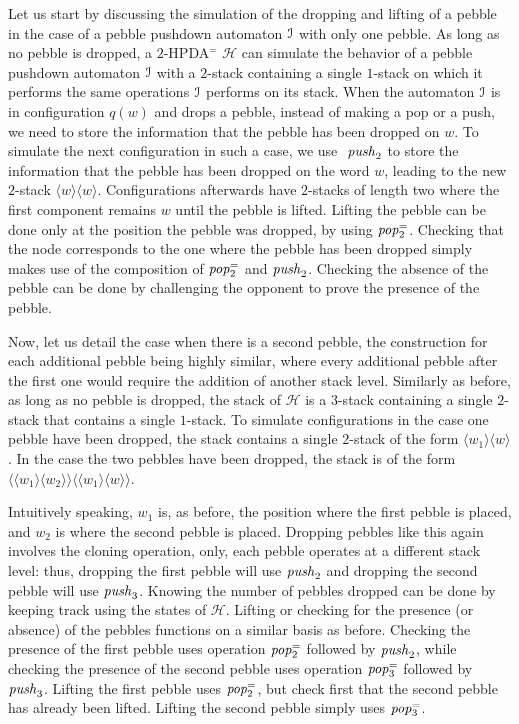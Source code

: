 \documentclass[a4paper,UKenglish,cleveref, autoref, thm-restate]{lipics-v2021}
\renewcommand{\H}{\mathcal{H}}
\begin{document}
{Let us start by discussing the simulation of the dropping and lifting of a pebble in the case of
a pebble pushdown automaton $\mathcal{I}$ with only one pebble.
As long as no pebble is dropped, a $2$-HPDA$^=$ $\H$ can simulate 
the behavior of a pebble pushdown automaton $\mathcal{I}$ with a $2$-stack containing a single $1$-stack
on which it performs the same operations $\mathcal{I}$ performs on its stack.
When the automaton $\mathcal{I}$ is in configuration $q(w)$ and drops a pebble, instead of making a pop or a push, we need
to %
	store the information that the pebble has been
dropped on $w$.
To simulate the next configuration in such a case, we use 
$\text{\textit{ push}}_2$
to store the information that the pebble has been dropped on the word $w$, leading to the new  $2$-stack
$\langle w \rangle \langle w \rangle$. 
Configurations afterwards have $2$-stacks of length two where the first component remains
$w$ until the pebble is lifted.
Lifting the pebble can be done only at the position the
pebble was dropped, by using $\text{\textit{pop}}^=_2$.
Checking that the node
corresponds to the one where the pebble has been dropped simply makes use of
the composition of $\text{\textit{pop}}^=_2$ and $\text{\textit{push}}_2$.
Checking the absence of the pebble can be done by challenging
the opponent to prove the presence of the pebble.

Now, let us detail the case when there is a second pebble, the construction
for each additional pebble being highly similar, where every additional pebble after
the first one would require the addition of another stack level.
Similarly as before, 
as long as no pebble is dropped, the stack of $\H$ 
is a $3$-stack containing a
single $2$-stack that contains a single $1$-stack.
To simulate configurations in the case one pebble have been dropped, the stack contains a single
 $2$-stack of the form $\langle w_1 \rangle \langle w \rangle$.
In the case the two pebbles have been dropped, 
the stack is of the form $ \langle \langle w_1 \rangle \langle w_2 \rangle \rangle
\langle \langle w_1 \rangle \langle w \rangle \rangle$. 



Intuitively speaking, $w_1$ is, as before, the position where the first pebble is
placed, and $w_2$ is where the second pebble is placed. Dropping pebbles like this
again involves the cloning operation, only, each pebble operates at a different 
stack level: thus, dropping the first pebble will use $\text{\textit{push}}_2$
and dropping the second pebble will use $\text{\textit{push}}_3$. Knowing the number of pebbles dropped can be done by 
keeping track using the states of $\H$.
Lifting or
checking for the presence 
(or absence) 
of the pebbles functions on a similar
basis as before. Checking the presence of the first pebble uses 
operation $\text{\textit{pop}}^=_2$ followed by $\text{\textit{push}}_2$,
while checking the presence of the second pebble uses 
operation $\text{\textit{pop}}^=_3$ followed by $\text{\textit{push}}_3$.
Lifting the first pebble uses $\text{\textit{pop}}^=_2$, but
check first that the second pebble has already been lifted.
Lifting the second pebble simply uses $\text{\textit{pop}}^=_3$.


}
\end{document}

